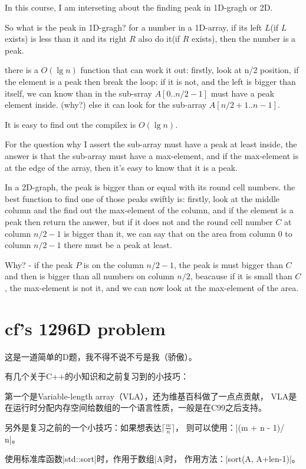 In this course, I am interseting about the finding peak in 1D-gragh or 2D.

So what is the peak in 1D-gragh?
for a number in a 1D-array, if its left $L$(if $L$ exists) is less than it and its
right $R$ also do it(if $R$ exists), then the number is a peak.

there is a $O(\lg n)$ function that can work it out:
firstly, look at n/2 position, if the element is a peak then break the loop;
if it is not, and the left is bigger than itself, we can know than in the
sub-srray $A[0..n/2-1]$ must have a peak element inside. (why?)
else it can look for the sub-array $A[n/2+1..n-1]$.

It is easy to find out the compilex is $O(\lg n)$.

For the question why I assert the sub-array must have a peak at least inside,
the answer is that the sub-array must have a max-element, and if the max-element
is at the edge of the array, then it's easy to know that it is a peak.

In a 2D-graph, the peak is bigger than or equal with its round cell numbers. the
best function to find one of those peaks swiftly is: firstly, look at the middle
column and the find out the max-element of the column, and if the element is a
peak then return the answer, but if it does not and the round cell number $C$ at
column $n/2-1$ is bigger than it, we can say that on the area from column $0$ to
column $n/2-1$ there must be a peak at least.

Why? - if the peak $P$ is on the column $n/2-1$, the peak is must bigger than
$C$ and then is bigger than all numbers on column $n/2$, beacause if it is small
than $C$, the max-element is not it, and we can now look at the max-element of
the area.


\section{cf's 1296D problem}

这是一道简单的D题，我不得不说不亏是我（骄傲）。

有几个关于C++的小知识和之前复习到的小技巧：

第一个是Variable-length array（VLA），还为维基百科做了一点点贡献，
VLA是在运行时分配内存空间给数组的一个语言性质，一般是在C99之后支持。

另外是复习之前的一个小技巧：如果想表达$\lceil\frac{m}{n}\rceil$，
则可以使用：\vb|(m + n - 1)/ n|。

使用标准库函数\vb|std::sort|时，作用于数组\vb|A|时，
作用方法：\vb|sort(A, A+len-1)|。

